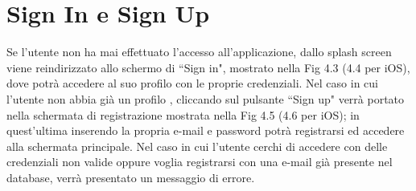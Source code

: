 \section*{Sign In e Sign Up}
Se l'utente non ha mai effettuato l'accesso all'applicazione, dallo splash screen viene reindirizzato allo schermo di ``Sign in", mostrato nella Fig 4.3 (4.4 per iOS), dove potr\`a accedere al suo profilo con le proprie credenziali.
Nel caso in cui l'utente non abbia gi\`a un profilo , cliccando sul pulsante ``Sign up" verr\`a portato nella schermata di registrazione mostrata nella Fig
4.5 (4.6 per iOS); in quest'ultima inserendo la propria e-mail e password potr\`a registrarsi ed accedere alla schermata principale.
Nel caso in cui l'utente cerchi di accedere con delle credenziali non valide oppure voglia registrarsi con una e-mail gi\`a
presente nel database, verr\`a presentato un messaggio di errore.
